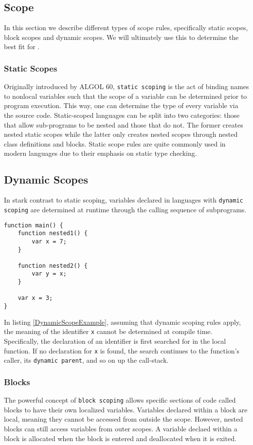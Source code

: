\subsection{Scope}
In this section we describe different types of scope rules, specifically static scopes, block scopes and dynamic scopes.
We will ultimately use this to determine the best fit for \dazel{}.

\subsubsection{Static Scopes}
Originally introduced by ALGOL 60, \texttt{static scoping} is the act of binding names to nonlocal variables such that the scope of a variable
can be determined prior to program execution. This way, one can determine the type of every variable via the source code.
Static-scoped languages can be split into two categories: those that allow sub-programs to be nested and those that do not.
The former creates nested static scopes while the latter only creates nested scopes through nested class definitions and blocks. 
Static scope rules are quite commonly used in modern languages due to their emphasis on static type checking.\cite{sebesta_concepts_2016}

\subsection{Dynamic Scopes}
In stark contrast to static scoping, variables declared in languages with \texttt{dynamic scoping} are determined at runtime through the calling sequence of subprograms.

\begin{lstlisting}[caption={Example of dynamic scoping}, label={lst:DynamicScopeExample}]
function main() {
	function nested1() {
		var x = 7;
	}
	
	function nested2() {
		var y = x;
	}

	var x = 3;
}
\end{lstlisting}

In listing \ref{DynamicScopeExample}, assuming that dynamic scoping rules apply, the meaning of the identifier \texttt{x} cannot be determined at compile time.
Specifically, the declaration of an identifier is first searched for in the local function. 
If no declaration for \texttt{x} is found, the search continues to the function's caller, its \texttt{dynamic parent}, and so on up the call-stack.\cite{sebesta_concepts_2016}

\subsubsection{Blocks}
The powerful concept of \texttt{block scoping} allows specific sections of code called blocks to have their own localized variables. 
Variables declared within a block are local, meaning they cannot be accessed from outside the scope. However, nested blocks can still access variables from outer scopes.
A variable declaed within a block is allocated when the block is entered and deallocated when it is exited.\cite{sebesta_concepts_2016}

